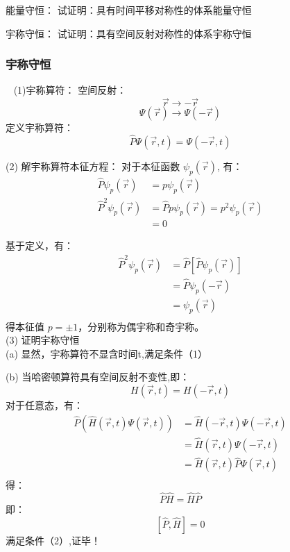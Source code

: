 \begin{frame} 
    \begin{tcolorbox2}{能量守恒：}
        试证明：具有时间平移对称性的体系能量守恒                               
    \end{tcolorbox2}
    \begin{tcolorbox2}{宇称守恒：}
        试证明：具有空间反射对称性的体系宇称守恒                             
    \end{tcolorbox2}
\end{frame}

\begin{frame}
    \frametitle{宇称守恒} 
    \证~ (1)宇称算符：
    空间反射：$$\vec{r} \to -\vec{r} $$
    $$\Psi(\vec{r}) \to \Psi(-\vec{r}) $$
    定义宇称算符： $$ \hat{P}\Psi(\vec{r},t) = \Psi(-\vec{r},t) $$
    
    (2) 解宇称算符本征方程： 
    对于本征函数 $\psi_p (\vec{r})$, 有：
    $$\begin{aligned}
        \hat{P}\psi_p (\vec{r}) &= p\psi_p (\vec{r}) \\
        \hat{P}^2\psi_p (\vec{r}) &= \hat{P} p\psi_p (\vec{r}) = p^2\psi_p (\vec{r})\\
        &= 0
    \end{aligned}$$
\end{frame}

\begin{frame} 
    基于定义，有：
    $$\begin{aligned}
        \hat{P}^2\psi_p (\vec{r}) &= \hat{P} [\hat{P} \psi_p (\vec{r})]\\
        &= \hat{P} \psi_p (-\vec{r})\\
        &= \psi_p (\vec{r})\\
    \end{aligned}$$
    得本征值 $p=\pm 1$，分别称为偶宇称和奇宇称。\\ \vspace{0.6em}
    (3) 证明宇称守恒 \\
    (a) 显然，宇称算符不显含时间t,满足条件（1）\\

\end{frame}

\begin{frame} 
    (b) 当哈密顿算符具有空间反射不变性,即：
    $$ H(\vec{r},t)= H(-\vec{r},t)$$
    对于任意态，有：
    $$\begin{aligned}
        \hat{P} (\hat{H}(\vec{r},t) \Psi (\vec{r},t)) &= \hat{H}(-\vec{r},t) \Psi (-\vec{r},t)\\
        &= \hat{H}(\vec{r},t) \Psi (-\vec{r},t)\\
        &= \hat{H}(\vec{r},t) \hat{P} \Psi (\vec{r},t)\\
    \end{aligned}$$
    得： $$ \hat{P} \hat{H} = \hat{H} \hat{P} $$
    即：$$[\hat{P}, \hat{H}]=0$$
    满足条件（2）,证毕！
\end{frame}

